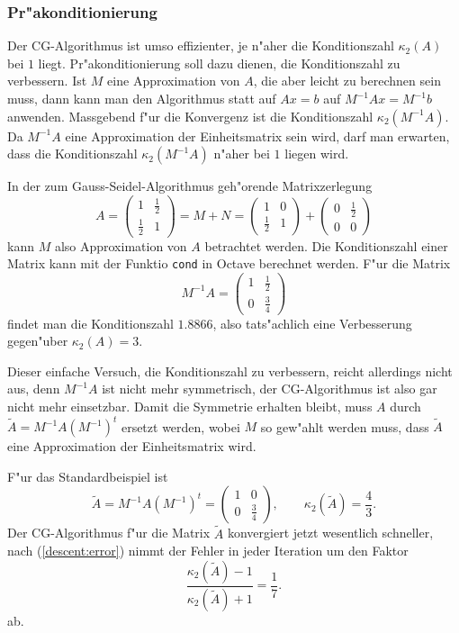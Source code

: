 \subsubsection{Pr"akonditionierung}
Der CG-Algorithmus ist umso effizienter, je n"aher die Konditionszahl
$\kappa_2(A)$ bei $1$ liegt.
Pr"akonditionierung soll dazu dienen, die Konditionszahl zu verbessern.
Ist $M$ eine Approximation von $A$, die aber leicht zu berechnen
sein muss, dann kann man den Algorithmus statt auf $Ax=b$ auf
$M^{-1}Ax=M^{-1}b$ anwenden.
Massgebend f"ur die Konvergenz ist die Konditionszahl
$\kappa_2(M^{-1}A)$. 
Da $M^{-1}A$ eine Approximation der Einheitsmatrix sein wird, darf
man erwarten, dass die Konditionszahl $\kappa_2(M^{-1}A)$ n"aher bei
$1$ liegen wird.

\begin{beispiel}
In der zum Gauss-Seidel-Algorithmus geh"orende Matrixzerlegung
\[
A=\begin{pmatrix}1&\frac12\\\frac12&1\end{pmatrix}
=M+N
=\begin{pmatrix}1&0\\\frac12&1\end{pmatrix}
+\begin{pmatrix}0&\frac12\\0&0\end{pmatrix}
\]
kann $M$ also Approximation von $A$ betrachtet werden.
Die Konditionszahl einer Matrix kann mit der Funktio {\tt cond} in
Octave berechnet werden. F"ur die Matrix
\[
M^{-1}A=\begin{pmatrix}
1&\frac12\\0&\frac34
\end{pmatrix}
\]
findet man die Konditionszahl $1.8866$, also tats"achlich eine Verbesserung
gegen"uber $\kappa_2(A)=3$.
\end{beispiel}

Dieser einfache Versuch, die Konditionszahl zu verbessern, reicht
allerdings nicht aus, denn $M^{-1}A$ ist nicht mehr symmetrisch, der
CG-Algorithmus ist also gar nicht mehr einsetzbar.
Damit die Symmetrie erhalten bleibt, muss $A$ durch $\tilde A=M^{-1}A(M^{-1})^t$
ersetzt werden, wobei $M$ so gew"ahlt werden muss, dass $\tilde A$ 
eine Approximation der Einheitsmatrix wird.

\begin{beispiel}
F"ur das Standardbeispiel ist
\[
\tilde A=
M^{-1}A(M^{-1})^t
=
\begin{pmatrix}
1&0\\
0&\frac34
\end{pmatrix},
\qquad
\kappa_2(\tilde A)=\frac43.
\]
Der CG-Algorithmus f"ur die Matrix
$\tilde A$ konvergiert jetzt wesentlich schneller, nach
(\ref{descent:error})
nimmt der Fehler in jeder Iteration um den Faktor
\[
\frac{\kappa_2(\tilde A) - 1}{\kappa_2(\tilde A) + 1}=\frac17.
\]
ab.
\end{beispiel}

